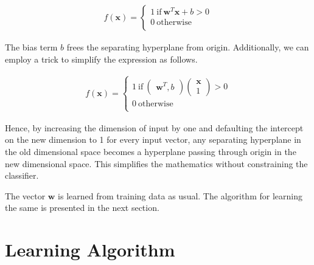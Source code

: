 \documentclass[11pt, a4paper]{article}
\begin{document}
\begin{align*}
	f(\boldsymbol{x}) = \left\{                           
	\begin{array}{ll}                                     
	1\ \text{if}\ \boldsymbol{w}^T \boldsymbol{x} + b > 0 \\
	0\ \text{otherwise}                                   \\
	\end{array}                                           
	\right.                                               
\end{align*}

The bias term $b$ frees the separating hyperplane from origin. Additionally, we can employ a trick to simplify the expression as follows.

\begin{align*}
	f(\boldsymbol{x}) = \left\{                                                                    
	\begin{array}{ll}                                                                              
	1\ \text{if}\ \begin{pmatrix} \boldsymbol{w}^T, b \end{pmatrix} \begin{pmatrix} \boldsymbol{x} \\ 
	1 \end{pmatrix} > 0                                                                            \\
	0\ \text{otherwise}                                                                            \\
	\end{array}                                                                                    
	\right.                                                                                        
\end{align*}

Hence, by increasing the dimension of input by one and defaulting the intercept on the new dimension to 1 for every input vector, any separating hyperplane in the old dimensional space 
becomes a hyperplane passing through origin in the new dimensional space. This simplifies the mathematics without constraining the classifier.

The vector $\boldsymbol{w}$ is learned from training data as usual. The algorithm for learning the same is presented in the next section. 

\section{Learning Algorithm}
\end{document}
